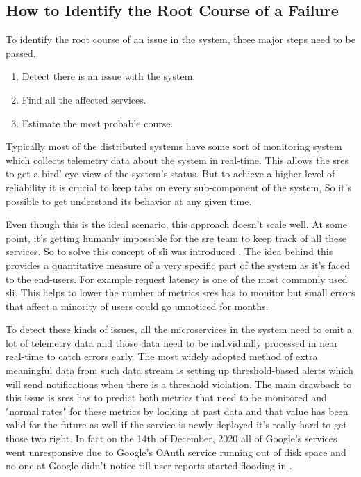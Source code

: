\subsection{How to Identify the Root Course of a Failure}\label{sec:how-root-course}


To identify the root course of an issue in the system, three major steps need to be passed.
\begin{enumerate}
\item Detect there is an issue with the system.
\item Find all the affected services.
\item Estimate the most probable course.
\end{enumerate}

Typically most of the distributed systems have some sort of monitoring system which collects telemetry data about the system in real-time. This allows the \acp{sre} to get a bird' eye view of the system's status. But to achieve a higher level of reliability it is crucial to keep tabs on every sub-component of the system, So it's possible to get understand its behavior at any given time. 

Even though this is the ideal scenario, this approach doesn't scale well. At some point, it's getting humanly impossible for the \ac{sre} team to keep track of all these services. So to solve this concept of \ac{sli} was introduced \citep{beyer2016site}. The idea behind this provides a quantitative measure of a very specific part of the system as it's faced to the end-users. For example request latency is one of the most commonly used \ac{sli}. This helps to lower the number of metrics \acp{sre} has to monitor but small errors that affect a minority of users could go unnoticed for months. 

To detect these kinds of issues, all the microservices in the system need to emit a lot of telemetry data and those data need to be individually processed in near real-time to catch errors early. The most widely adopted method of extra meaningful data from such data stream is setting up threshold-based alerts which will send notifications when there is a threshold violation. The main drawback to this issue is \acp{sre} has to predict both metrics that need to be monitored and "normal rates" for these metrics by looking at past data and that value has been valid for the future as well if the service is newly deployed it's really hard to get those two right. In fact on the 14th of December, 2020 all of Google's services went unresponsive due to Google's OAuth service running out of disk space and no one at Google didn't notice till user reports started flooding in \citep{Googleoutage:online}. 

